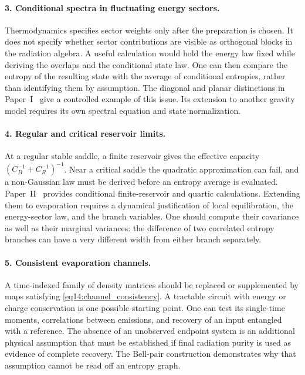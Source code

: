 \documentclass[11pt,letterpaper]{article}
\theoremstyle{plain}
\theoremstyle{definition}
\theoremstyle{remark}
\begin{document}
\paragraph{3. Conditional spectra in fluctuating energy sectors.}
Thermodynamics specifies sector weights only after the preparation is
chosen. It does not specify whether sector contributions are visible
as orthogonal blocks in the radiation algebra. A useful calculation
would hold the energy law fixed while deriving the overlaps and the
conditional state law. One can then compare the entropy of the
resulting state with the average of conditional entropies, rather than
identifying them by assumption. The diagonal and planar distinctions
in Paper~I~\citep{wuebben2026paper1} give a controlled example of this
issue. Its extension to another gravity model requires its own
spectral equation and state normalization.

\paragraph{4. Regular and critical reservoir limits.}
At a regular stable saddle, a finite reservoir gives the effective
capacity $(C_B^{-1}+C_R^{-1})^{-1}$. Near a critical saddle the quadratic
approximation can fail, and a non-Gaussian law must be derived before
an entropy average is evaluated. Paper~II~\citep{wuebben2026paper2}
provides conditional finite-reservoir and quartic calculations.
Extending them to evaporation requires a dynamical justification of
local equilibration, the energy-sector law, and the branch variables.
One should compute their covariance as well as their marginal
variances: the difference of two correlated entropy branches can have
a very different width from either branch separately.

\paragraph{5. Consistent evaporation channels.}
A time-indexed family of density matrices should be replaced or
supplemented by maps satisfying
\eqref{eq14:channel_consistency}. A tractable circuit with energy or
charge conservation is one possible starting point. One can test its
single-time moments, correlations between emissions, and recovery of
an input entangled with a reference. The absence of an unobserved
endpoint system is an additional physical assumption that must be
established if final radiation purity is used as evidence of complete
recovery. The Bell-pair construction demonstrates why that assumption
cannot be read off an entropy graph.
\end{document}
